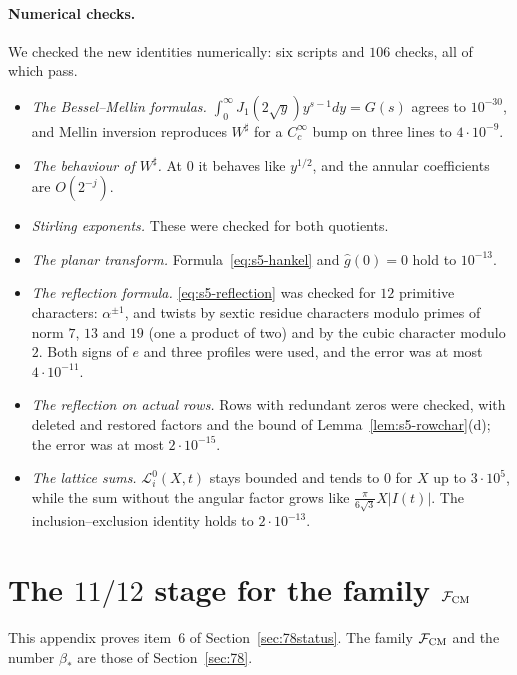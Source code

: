 \documentclass[11pt]{article}
\numberwithin{equation}{section}
\begin{document}
\paragraph{Numerical checks.} We checked the new identities numerically: six scripts and $106$ checks, all of
which pass.
\begin{itemize}
\item \emph{The Bessel--Mellin formulas.} $\int_0^\infty J_1(2\sqrt y)y^{s-1}dy=G(s)$ agrees to
 $10^{-30}$, and Mellin inversion reproduces $W^\sharp$ for a $C_c^\infty$ bump on three lines to
 $4\cdot10^{-9}$.
\item \emph{The behaviour of $W^\sharp$.} At $0$ it behaves like $y^{1/2}$, and the annular coefficients
 are $O(2^{-j})$.
\item \emph{Stirling exponents.} These were checked for both quotients.
\item \emph{The planar transform.} Formula~\eqref{eq:s5-hankel} and $\widehat g(0)=0$ hold to $10^{-13}$.

\item \emph{The reflection formula.} \eqref{eq:s5-reflection} was checked for $12$ primitive characters:
 $\alpha^{\pm1}$, and twists by sextic residue characters modulo primes of norm $7$, $13$ and $19$ (one a
 product of two) and by the cubic character modulo $2$. Both signs of $e$ and three profiles were used,
 and the error was at most $4\cdot10^{-11}$.
\item \emph{The reflection on actual rows.} Rows with redundant zeros were checked, with deleted and
 restored factors and the bound of Lemma~\ref{lem:s5-rowchar}(d); the error was at most $2\cdot10^{-15}$.
\item \emph{The lattice sums.} $\mathcal L_i^0(X,t)$ stays bounded and tends to $0$ for $X$ up to
 $3\cdot10^5$, while the sum without the angular factor grows like $\frac{\pi}{6\sqrt3}X|I(t)|$. The
 inclusion--exclusion identity holds to $2\cdot10^{-13}$.
\end{itemize}

\section{The \texorpdfstring{$11/12$}{11/12} stage for the family \texorpdfstring{$\mathcal F_{\rm CM}$}{F\_CM}}\label{app:s6}

This appendix proves item~6 of Section~\ref{sec:78status}. The family $\mathcal F_{\rm CM}$ and the
number $\beta_*$ are those of Section~\ref{sec:78}.
\end{document}
